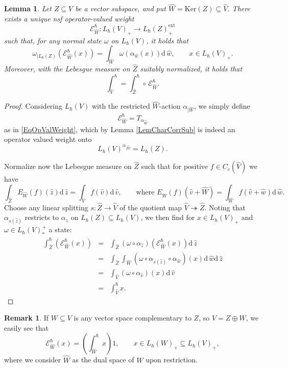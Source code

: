 \documentclass[11pt, reqno]{amsart}
\newtheorem{lemma}[theorem]{Lemma}
\theoremstyle{definition}
\newtheorem{remark}[theorem]{Remark}
\numberwithin{equation}{section}
\newcommand{\rd}{\mathrm{d}\!\,}
\newcommand{\Ker}{\mathrm{Ker}}
\newcommand{\ext}{\mathrm{ext}}
\newcommand{\msE}{\mathscr{E}}
\begin{document}
\begin{lemma}
Let $Z \subseteq V$ be a vector subspace, and put $\hat{W} = \Ker(Z) \subseteq \hat{V}$. There exists a unique nsf operator-valued weight 
\begin{equation}\label{EqOVW}
\msE^{\hbar}_{\hat{W}}\colon  L_{\hbar}(V)_+\rightarrow L_{\hbar}(Z)_+^{\ext}
\end{equation}
such that, for any normal state $\omega$ on $L_{\hbar}(V)$, it holds that   
\[
\omega_{\mid L_{\hbar}(Z)}\left(\msE^{\hbar}_{\hat{W}} (x)\right) = \int_{\hat{W}} \omega(\alpha_{\hat{w}}(x))\rd \hat{w},\qquad x\in L_{\hbar}(V)_+. 
\]
Moreover, with the Lebesgue measure on $\hat{Z}$ suitably normalized, it holds that 
\[
\int^{\hbar}_{\hat{V}} = \int^{\hbar}_{\hat{Z}}\circ\, \msE^{\hbar}_{\hat{W}}.
\]
\end{lemma}
\begin{proof}
Considering $L_{\hbar}(V)$ with the restricted $\hat{W}$-action $\alpha_{\mid \hat{W}}$, we simply define 
\[
\msE_{\hat{W}}^{\hbar} = T_{\alpha_{\hat{W}}}
\]
as in \eqref{EqOpValWeight}, which by Lemma \ref{LemCharCorrSub} is indeed an operator valued weight onto
\[
L_{\hbar}(V)^{\alpha_{\mid \hat{W}}} = L_{\hbar}(Z).
\]

Normalize now the Lebesgue measure on $\hat{Z}$ such that for positive $f\in C_c(\hat{V})$ we have
\[
\int_{\hat{Z}} E_{\hat{W}}(f)(\hat{z})\rd\hat{z} = \int_{\hat{V}}f(\hat{v})\rd\hat{v},\qquad \textrm{where } E_{\hat{W}}(f)(\hat{v}+\hat{W}) = \int_{\hat{W}}f(\hat{v}+\hat{w})\rd\hat{w}.
\]
Choose any linear splitting $s\colon  \hat{Z}\rightarrow \hat{V}$ of the quotient map $\hat{V}\twoheadrightarrow \hat{Z}$. Noting that $\alpha_{s(\hat{z})}$ restricts to $\alpha_z$ on $L_{\hbar}(Z) \subseteq L_{\hbar}(V)$, we then find for $x\in L_{\hbar}(V)_+$ and $\omega \in L_{\hbar}(V)_*^+$ a state: 
\begin{eqnarray*}
\int_{\hat{Z}}^{\hbar}\left(\msE_{\hat{W}}^{\hbar} (x)\right) &=&  \int_{\hat{Z}} (\omega \circ \alpha_{\hat{z}})\left(\msE_{\hat{W}}^{\hbar} (x)\right) \rd \hat{z} \\
&=& \int_{\hat{Z}} \int_{\hat{W}} (\omega\circ \alpha_{s(\hat{z})}\circ \alpha_{\hat{w}})(x) \rd \hat{w} \rd \hat{z}\\
&=& \int_{\hat{V}} (\omega\circ \alpha_{\hat{v}})(x) \rd \hat{v}\\
&=& \int_{\hat{V}}^{\hbar} x.
\end{eqnarray*}
\end{proof}

\begin{remark}\label{RemWeight}
If $W \subseteq V$ is any vector space complementary to $Z$, so $V = Z\oplus W$, we easily see that 
\[
\msE_{\hat{W}}^{\hbar} (x) = \left(\int_{\hat{W}}^{\hbar}x\right)1,\qquad x\in L_{\hbar}(W)_+ \subseteq L_{\hbar}(V)_+,
\]
where we consider $\hat{W}$ as the dual space of $W$ upon restriction.
\end{remark} 
\end{document}
